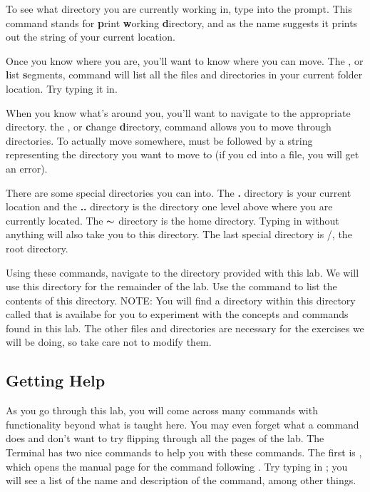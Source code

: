 To see what directory you are currently working in, type  into the prompt.
This command stands for \textbf{p}rint \textbf{w}orking \textbf{d}irectory, and as the name suggests it prints out the string of your current location.

Once you know where you are, you'll want to know where you can move.
The , or \textbf{l}ist \textbf{s}egments, command will list all the files and directories in your current folder location.
Try typing it in.

When you know what's around you, you'll want to navigate to the appropriate directory.
the , or \textbf{c}hange \textbf{d}irectory, command allows you to move through directories.
To actually move somewhere,  must be followed by a string representing the directory you want to move to (if you cd into a file, you will get an error).

There are some special directories you can  into.
The \textbf{.} directory is your current location and the \textbf{..} directory is the directory one level above where you are currently located.
The $\thicksim$ directory is the home directory.
Typing in  without anything will also take you to this directory.
The last special directory is /, the root directory.

\begin{problem}
Using these commands, navigate to the  directory provided with this lab. We will use this directory for the remainder of the lab. Use the  command to list the contents of this directory. NOTE: You will find a directory within this directory called  that is availabe for you to experiment with the concepts and commands found in this lab. The other files and directories are necessary for the exercises we will be doing, so take care not to modify them.
\end{problem}

\subsection*{Getting Help}
As you go through this lab, you will come across many commands with functionality beyond what is taught here.
You may even forget what a command does and don't want to try flipping through all the pages of the lab.
The Terminal has two nice commands to help you with these commands.
The first is , which opens the manual page for the command following .
Try typing in ; you will see a list of the name and description of the  command, among other things.

